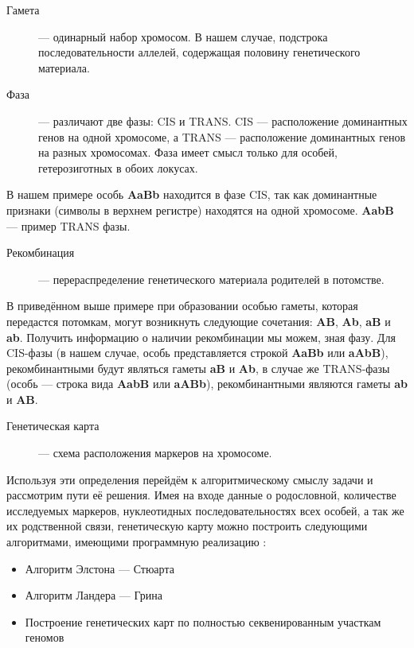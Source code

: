 \documentclass{matmex-diploma-custom}
\begin{document}
\begin{description}
\item[Гамета] --- одинарный набор хромосом. В нашем случае,
  подстрока последовательности аллелей, содержащая половину
  генетического материала.

\item[Фаза] --- различают две фазы: CIS и TRANS. CIS --- расположение
  доминантных генов на одной хромосоме, а TRANS --- расположение
  доминантных генов на разных хромосомах. Фаза имеет смысл только для
  особей, гетерозиготных в обоих локусах.
\end{description}
В нашем примере особь \textbf{AaBb} находится в фазе CIS, так как
доминантные признаки (символы в верхнем регистре) находятся на одной
хромосоме. \textbf{AabB} --- пример TRANS фазы.

\begin{description}
\item[Рекомбинация] --- перераспределение генетического материала
  родителей в потомстве.
\end{description}
В приведённом выше примере при образовании особью гаметы, которая
передастся потомкам, могут возникнуть следующие сочетания:
\textbf{AB}, \textbf{Ab}, \textbf{aB} и \textbf{ab}. Получить
информацию о наличии рекомбинации мы можем, зная фазу. Для CIS-фазы (в
нашем случае, особь представляется строкой \textbf{AaBb} или
\textbf{aAbB}), рекомбинантными будут являться гаметы \textbf{aB} и
\textbf{Ab}, в случае же TRANS-фазы (особь --- строка вида
\textbf{AabB} или \textbf{aABb}), рекомбинантными являются гаметы
\textbf{ab} и \textbf{AB}.

\begin{description}
\item[Генетическая карта] --- схема расположения маркеров на хромосоме.
\end{description}

Используя эти определения перейдём к алгоритмическому смыслу задачи и
рассмотрим пути её решения. Имея на входе данные о родословной,
количестве исследуемых маркеров, нуклеотидных последовательностях всех
особей, а так же их родственной связи, генетическую карту можно
построить следующими алгоритмами, имеющими программную реализацию
\cite{fishelson2002exact}:
\begin{itemize}
\item Алгоритм Элстона --- Стюарта
\item Алгоритм Ландера --- Грина
\item Построение генетических карт по полностью секвенированным
  участкам геномов
\end{itemize}
\end{document}
